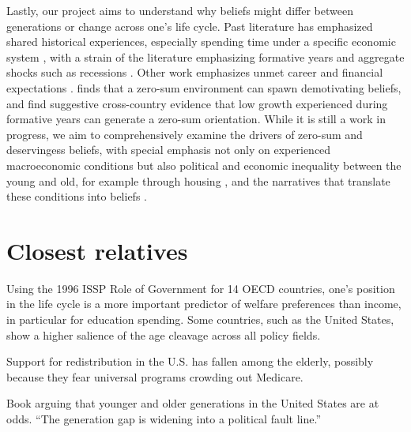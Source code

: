 \documentclass{article}
\newcommand{\citem}[1]{\medskip \noindent \textbf{\cite*{#1}}}
\begin{document}
Lastly, our project aims to understand why beliefs might differ between generations or change across one's life cycle. Past literature has emphasized shared historical experiences, especially spending time under a specific economic system \citep{alesina2007good,landier2008investigating,fuchs2015endogeneity}, with a strain of the literature emphasizing formative years \citep{mannheim1952sociological,krosnick1989aging,malmendier2011depression,roth2018experienced} and aggregate shocks such as recessions \citep{margalit2013explaining, carreri2023economic, giuliano2023recessions, giuliano2024aggregate}. Other work emphasizes unmet career and financial expectations \citep{kurer2022disappointed,cox2024great}. \cite{carvalho2023zero} finds that a zero-sum environment can spawn demotivating beliefs, and \cite{chinoy2026zero} find suggestive cross-country evidence that low growth experienced during formative years can generate a zero-sum orientation. While it is still a work in progress, we aim to comprehensively examine the drivers of zero-sum and deservingess beliefs, with special emphasis not only on experienced macroeconomic conditions but also political and economic inequality between the young and old, for example through housing \citep{ansell2014political, steele2020wealth, gale2020wealth, furtado2025housing}, and the narratives that translate these conditions into beliefs \citep{graeber2024stories,gehring2025virality}. 





\section{Closest relatives}

\citem{busemeyer2009attitudes}

Using the 1996 ISSP Role of Government for 14 OECD countries, one’s position in the life cycle is a more important predictor of welfare preferences than income, in particular for education spending. Some countries, such as the United States, show a higher salience of the age cleavage across all policy fields.

\citem{ashok2015support}

Support for redistribution in the U.S. has fallen among the elderly, possibly because they fear universal programs crowding out Medicare.

\citem{munger2022generation}

Book arguing that younger and older generations in the United States are at odds. ``The generation gap is widening into a political fault line.''
\end{document}
